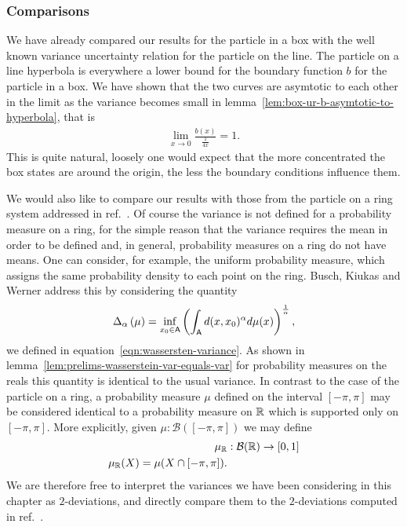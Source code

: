 \subsubsection{Comparisons}

We have already compared our results for the particle in a box with the well known variance uncertainty relation for the particle on the line. The particle on a line hyperbola is everywhere a lower bound for the boundary function $b$ for the particle in a box. We have shown that the two curves are asymtotic to each other in the limit as the variance becomes small in lemma~\ref{lem:box-ur-b-asymtotic-to-hyperbola}, that is
\begin{align}
  \lim_{x\to 0} \frac{b(x)}{\frac{1}{4x}} = 1.
\end{align}
This is quite natural, loosely one would expect that the more concentrated the box states are around the origin, the less the boundary conditions influence them. 

We would also like to compare our results with those from the particle on a ring system addressed in ref.~\cite{sharp-ur-num-angle}. Of course the variance is not defined for a probability measure on a ring, for the simple reason that the variance requires the mean in order to be defined and, in general, probability measures on a ring do not have means. One can consider, for example, the uniform probability measure, which assigns the same probability density to each point on the ring. Busch, Kiukas and Werner address this by considering the quantity
\begin{align}
  \wsDev{\mu}[\alpha] = \inf_{x_0\in\mathsf{A}} \left(\int_{\mathsf{A}} d(x,x_0)^\alpha d\mu(x)\right)^\frac{1}{\alpha},
\end{align}
we defined in equation~\ref{eqn:wassersten-variance}. As shown in lemma~\ref{lem:prelims-wasserstein-var-equals-var} for probability measures on the reals this quantity is identical to the usual variance. In contrast to the case of the particle on a ring, a probability measure $\mu$ defined on the interval $[-\pi,\pi]$ may be considered identical to a probability measure on $\mathbb{R}$ which is supported only on $[-\pi,\pi]$. More explicitly, given $\mu:\mathcal{B}([-\pi,\pi])$ we may define
\begin{align}
  \mu_{\mathbb{R}}&: \mathcal{B}(\mathbb{R}) \to [0,1]\\
  \mu_{\mathbb{R}}(X) = \mu(X\cap [-\pi,\pi]).
\end{align}
We are therefore free to interpret the variances we have been considering in this chapter as $2$-deviations, and directly compare them to the $2$-deviations computed in ref.~\cite{sharp-ur-num-angle}.

